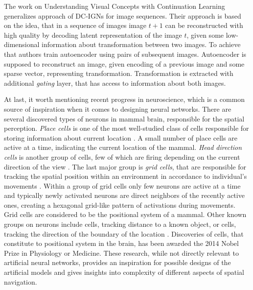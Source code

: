 The work on Understanding Visual Concepts with Continuation Learning \cite{Whitney2016} generalizes approach of DC-IGNs for image sequences.
Their approach is based on the idea, that in a sequence of images image $t+1$ can be reconstructed with high quality by decoding latent representation of the image $t$, given some low-dimensional information about transformation between two images.
To achieve that authors train autoencoder using pairs of subsequent images.
Autoencoder is supposed to reconstruct an image, given encoding of a previous image and some sparse vector, representing transformation.
Transformation is extracted with additional \textit{gating} layer, that has access to information about both images.

At last, it worth mentioning recent progress in neuroscience, which is a common source of inspiration when it comes to designing neural networks.
There are several discovered types of neurons in mammal brain, responsible for the spatial perception.
\textit{Place cells} is one of the most well-studied class of cells responsible for storing information about current location \cite{Fenton2009, Hartley2014}.
A small number of place cells are active at a time, indicating the current location of the mammal.
\textit{Head direction cells} is another group of cells, few of which are firing depending on the current direction of the view \cite{Taube1990, Taube1990a}.
The last major group is \textit{grid cells}, that are responsible for tracking the spatial position within an environment in accordance to individual's movements \cite{Moser2008}.
Within a group of grid cells only few neurons are active at a time and typically newly activated neurons are direct neighbors of the recently active ones, creating a hexagonal grid-like pattern of activations during movements.
Grid cells are considered to be the positional system of a mammal.
Other known groups on neurons include cells, tracking distance to a known object, or cells, tracking the direction of the boundary of the location \cite{Lever2009}.
Discoveries of cells, that constitute to positional system in the brain, has been awarded the 2014 Nobel Prize in Physiology or Medicine.
These research, while not directly relevant to artificial neural networks, provides an inspiration for possible designs of the artificial models and gives insights into complexity of different aspects of spatial navigation.
